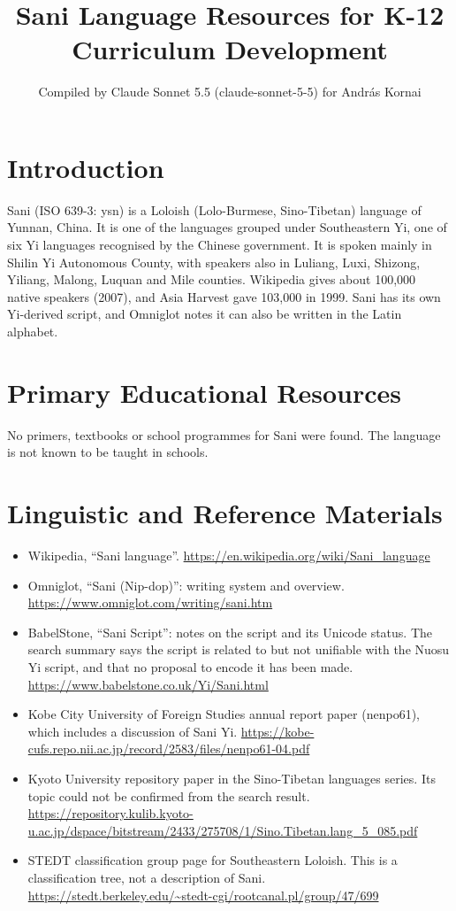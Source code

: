 \documentclass[12pt]{article}
\title{Sani Language Resources for K-12 Curriculum Development}
\author{Compiled by Claude Sonnet 5.5 (claude-sonnet-5-5) for Andr\'as Kornai}
\date{}
\begin{document}
\maketitle

\section{Introduction}
Sani (ISO 639-3: ysn) is a Loloish (Lolo-Burmese, Sino-Tibetan) language of Yunnan, China. It is one of the languages grouped under Southeastern Yi, one of six Yi languages recognised by the Chinese government. It is spoken mainly in Shilin Yi Autonomous County, with speakers also in Luliang, Luxi, Shizong, Yiliang, Malong, Luquan and Mile counties. Wikipedia gives about 100,000 native speakers (2007), and Asia Harvest gave 103,000 in 1999. Sani has its own Yi-derived script, and Omniglot notes it can also be written in the Latin alphabet.

\section{Primary Educational Resources}
No primers, textbooks or school programmes for Sani were found. The language is not known to be taught in schools.

\section{Linguistic and Reference Materials}
\begin{itemize}
\item Wikipedia, ``Sani language''. \url{https://en.wikipedia.org/wiki/Sani_language}
\item Omniglot, ``Sani (Nip-dop)'': writing system and overview. \url{https://www.omniglot.com/writing/sani.htm}
\item BabelStone, ``Sani Script'': notes on the script and its Unicode status. The search summary says the script is related to but not unifiable with the Nuosu Yi script, and that no proposal to encode it has been made. \url{https://www.babelstone.co.uk/Yi/Sani.html}
\item Kobe City University of Foreign Studies annual report paper (nenpo61), which includes a discussion of Sani Yi. \url{https://kobe-cufs.repo.nii.ac.jp/record/2583/files/nenpo61-04.pdf}
\item Kyoto University repository paper in the Sino-Tibetan languages series. Its topic could not be confirmed from the search result. \url{https://repository.kulib.kyoto-u.ac.jp/dspace/bitstream/2433/275708/1/Sino.Tibetan.lang_5_085.pdf}
\item STEDT classification group page for Southeastern Loloish. This is a classification tree, not a description of Sani. \url{https://stedt.berkeley.edu/~stedt-cgi/rootcanal.pl/group/47/699}
\end{itemize}
\end{document}
